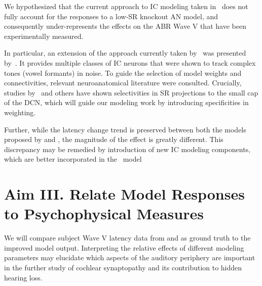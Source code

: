 We hypothesized that the current approach to IC modeling taken in~\cite{Verhulst2015Functional,Mehraei2016Auditory} does not fully account for the responses to a low-SR knockout AN model, and consequently under-represents the effects on the ABR Wave V that have been experimentally measured.  

In particular, an extension of the approach currently taken by~\cite{Verhulst2015Functional} was presented by~\cite{Carney2015Speech}.  It provides multiple classes of IC neurons that were shown to track complex tones (vowel formants) in noise.  To guide the selection of model weights and connectivities, relevant neuroanatomical literature were consulted.  Crucially, studies by~\cite{Ryugo2008Projections} and others have shown selectivities in SR projections to the small cap of the DCN, which will guide  our modeling work by introducing specificities in weighting. 

Further, while the latency change trend is preserved between both the models proposed by \citeauthor{Zilany2014Updated} and \citeauthor{Verhulst2015Functional}, the magnitude of the effect is greatly different.  This discrepancy may be remedied by introduction of new IC modeling components, which are better incorporated in the~\cite{Zilany2014Updated} model

\section{Aim III. Relate Model Responses to Psychophysical Measures}  
We will compare subject Wave V latency data from \citeauthor{Mehraei2015Auditory} and \citeauthor{Mehraei2015Individual} as ground truth to the improved model output.  Interpreting the relative effects of different modeling parameters may elucidate which aspects of the auditory periphery are important in the further study of cochlear synaptopathy and its contribution to hidden hearing loss. 